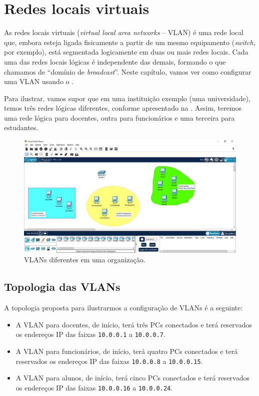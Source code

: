 \chapter{Redes locais virtuais}\label{chp:vlan}
As redes locais virtuais (\textit{virtual local area networks} -- VLAN) é uma rede local que, embora esteja ligada fisicamente a partir de um mesmo equipamento (\textit{switch}, por exemplo), está segmentada logicamente em duas ou mais redes locais. Cada uma das redes locais lógicas é independente das demais, formando o que chamamos de \enquote{domínio de \textit{broadcast}}. Neste capítulo, vamos ver como configurar uma VLAN usando o \CPT. 

Para ilustrar, vamos supor que em uma instituição exemplo (uma universidade), temos três redes lógicas diferentes, conforme apresentado na . Assim, teremos uma rede lógica para docentes, outra para funcionários e uma terceira para estudantes.

\begin{figure}[!htb]
    \centering
    \includegraphics[width=.99\textwidth]{Figuras/vlan}
    \caption{VLANs diferentes em uma organização.}
    \label{fig:vlan}
\end{figure}

\section{Topologia das VLANs}\label{sec:topVLAN}
A topologia proposta para ilustrarmos a configuração de VLANs é a seguinte:
\begin{itemize}
    \item A VLAN para docentes, de início, terá três PCs conectados e terá reservados os endereços IP das faixas \texttt{10.0.0.1} a  \texttt{10.0.0.7}.
    \item A VLAN para funcionários, de início, terá quatro PCs conectados e terá reservados os endereços IP das faixas \texttt{10.0.0.8} a  \texttt{10.0.0.15}.
    \item A VLAN para alunos, de início, terá cinco PCs conectados e terá reservados os endereços IP das faixas \texttt{10.0.0.16} a  \texttt{10.0.0.24}.
\end{itemize}

